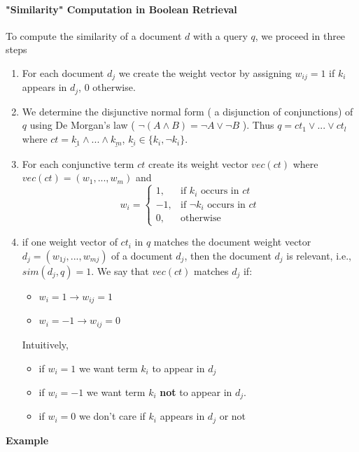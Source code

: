 \paragraph{"Similarity" Computation in Boolean Retrieval}

To compute the similarity of a document $d$ with a query $q$, we proceed in three steps
\begin{enumerate}
\item For each document $d_j$ we create the weight vector by assigning $w_{ij}=1$ if $k_i$ appears in $d_j$, $0$ otherwise.
\item We determine the disjunctive normal form ( a disjunction of conjunctions) of $q$ using De Morgan's law ( $\neg( A \land B )= \neg A \lor \neg B$ ). Thus $q = ct_1 \lor ... \lor ct_l$ where $ct= \underline{k_1} \land ... \land \underline{k_m}$, $\underline{k_i} \in \{k_i, \neg k_i\}$.
\item For each conjunctive term $ct$ create its weight vector $vec(ct)$ where $vec(ct)=(w_1,...,w_m)$ and 
\begin{equation*}
w_i = \begin{cases}
	1, & \text{if } k_i \text{ occurs in } ct \\
	-1, & \text{if } \neg k_i \text{ occurs in } ct \\
	0, & \text{otherwise}
	\end{cases}
\end{equation*}

\item if one weight vector of $ct_i$ in $q$ matches the document weight vector $d_j = (w_{1j},...,w_{mj})$ of a document $d_j$, then the document $d_j$ is relevant, i.e., $sim(d_j,q)=1$. We say that $vec(ct)$ matches $d_j$ if: 
\begin{itemize}
\item $w_i = 1 \rightarrow w_{ij} = 1$
\item $w_i = -1 \rightarrow w_{ij} = 0$

\end{itemize}
Intuitively, 
\begin{itemize}
\item if $w_i = 1$ we want term $k_i$ to appear in $d_j$
\item if $w_i=-1$ we want term $k_i$ \textbf{not} to appear in $d_j$.
\item if $w_i = 0$ we don't care if $k_i$ appears in $d_j$ or not
 \end{itemize} 
\end{enumerate} 
\textbf{Example}


